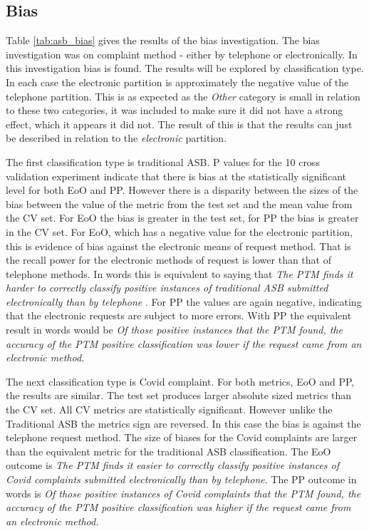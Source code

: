 \subsection{Bias} 
Table \ref{tab:asb_bias} gives the results of the bias investigation. The bias investigation was on complaint method - either by telephone or electronically. In this investigation bias is found. The results will be explored by classification type. In each case the electronic partition is approximately the negative value of the telephone partition. This is as expected as the \emph{Other} category is small in relation to these two categories, it was included to make sure it did not have a strong effect, which it appears it did not. The result of this is that the results can just be described in relation to the \emph{electronic} partition. 


The first classification type is traditional ASB. P values for the 10 cross validation experiment indicate that there is bias at the statistically significant level for both EoO and PP. However there is a disparity between the sizes of the bias between the value of the metric from the test set and the mean value from the CV set. For EoO the bias is greater in the test set, for PP the bias is greater in the CV set. For EoO, which has a negative value for the electronic partition, this is evidence of bias against the electronic means of request method. That is the recall power for the electronic methods of request is lower than that of telephone methods. In words this is equivalent to saying that \emph{The PTM finds it harder to correctly classify positive instances of traditional ASB submitted electronically than by telephone} . For PP the values are again negative, indicating that the electronic requests are subject to more errors. With PP the equivalent result in words would be \emph{Of those positive instances that the PTM found, the accuracy of the PTM positive classification was lower if the request came from an electronic method. }

The next classification type is Covid complaint. For both metrics, EoO and PP, the results are similar. The test set produces larger absolute sized metrics than the CV set. All CV metrics are statistically significant. However unlike the Traditional ASB the metrics sign are reversed. In this case the bias is against the telephone request method. The size of biases for the Covid complaints are larger than the equivalent metric for the traditional ASB classification. The EoO outcome is \emph{The PTM finds it easier to correctly classify positive instances of Covid complaints submitted electronically than by telephone}. The PP outcome in words is \emph{Of those positive instances of Covid complaints that the PTM found, the accuracy of the PTM positive classification was higher if the request came from an electronic method.}     


